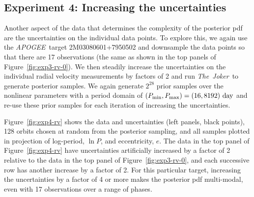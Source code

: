 \documentclass[manuscript, letterpaper]{aastex6}
\newcommand{\project}[1]{\textsl{#1}}
\newcommand{\acronym}[1]{{\small{#1}}}
\newcommand{\apogee}{\project{\acronym{APOGEE}}}
\newcommand{\samplername}{\project{The~Joker}}
\newcommand{\figname}{Figure}
\begin{document}

\subsection{Experiment 4: Increasing the uncertainties}

Another aspect of the data that determines the complexity of the posterior pdf
are the uncertainties on the individual data points.
To explore this, we again use the \apogee\ target 2M03080601+7950502 and
downsample the data points so that there are 17 observations (the same as shown
in the top panels of \figname~\ref{fig:exp3-rv-0}).
We then steadily increase the uncertainties on the individual radial velocity
measurements by factors of 2 and run \samplername\ to generate posterior
samples.
We again generate $2^{28}$ prior samples over the nonlinear parameters with a
period domain of $(P_{\rm min}, P_{\rm max}) = (16, 8192)~{\rm day}$ and re-use
these prior samples for each iteration of increasing the uncertainties.

\figname~\ref{fig:exp4-rv} shows the data and uncertainties (left panels, black
points), 128 orbits chosen at random from the posterior sampling, and all
samples plotted in projection of log-period, $\ln P$, and eccentricity, $e$.
The data in the top panel of \figname~\ref{fig:exp4-rv} have uncertainties
artificially increased by a factor of 2 relative to the data in the top panel of
\figname~\ref{fig:exp3-rv-0}, and each successive row has another increase by a
factor of 2.
For this particular target, increasing the uncertainties by a factor of 4 or
more makes the posterior pdf multi-modal, even with 17 observations over a range
of phases.
\end{document}
